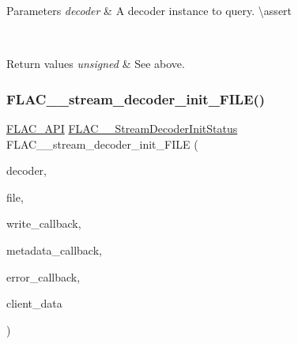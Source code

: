 \begin{DoxyParams}{Parameters}
{\em decoder} & A decoder instance to query. \textbackslash{}assert 
\begin{DoxyCode}{1}
\end{DoxyCode}
 \\
\hline
\end{DoxyParams}

\begin{DoxyRetVals}{Return values}
{\em unsigned} & See above. \\
\hline
\end{DoxyRetVals}
\mbox{\label{group__flac__stream__decoder_ga38f9eb46bf112af205f86b4cbac9980c}} 
\subsubsection{\texorpdfstring{FLAC\_\_stream\_decoder\_init\_FILE()}{FLAC\_\_stream\_decoder\_init\_FILE()}}
{\footnotesize\ttfamily \mbox{\hyperlink{group__flac__export_ga56ca07df8a23310707732b1c0007d6f5}{F\+L\+A\+C\+\_\+\+A\+PI}} \mbox{\hyperlink{group__flac__stream__decoder_gaaed54a24ac6310d29c5cafba79759c44}{F\+L\+A\+C\+\_\+\+\_\+\+Stream\+Decoder\+Init\+Status}} F\+L\+A\+C\+\_\+\+\_\+stream\+\_\+decoder\+\_\+init\+\_\+\+F\+I\+LE (\begin{DoxyParamCaption}\item[{\mbox{\hyperlink{struct_f_l_a_c_____stream_decoder}{F\+L\+A\+C\+\_\+\+\_\+\+Stream\+Decoder}} $\ast$}]{decoder,  }\item[{F\+I\+LE $\ast$}]{file,  }\item[{\mbox{\hyperlink{group__flac__stream__decoder_ga61e48dc2c0d2f6c5519290ff046874a4}{F\+L\+A\+C\+\_\+\+\_\+\+Stream\+Decoder\+Write\+Callback}}}]{write\+\_\+callback,  }\item[{\mbox{\hyperlink{group__flac__stream__decoder_ga6aa87c01744c1c601b7f371f627b6e14}{F\+L\+A\+C\+\_\+\+\_\+\+Stream\+Decoder\+Metadata\+Callback}}}]{metadata\+\_\+callback,  }\item[{\mbox{\hyperlink{group__flac__stream__decoder_gac896ee6a12668e9015fab4fbc6aae996}{F\+L\+A\+C\+\_\+\+\_\+\+Stream\+Decoder\+Error\+Callback}}}]{error\+\_\+callback,  }\item[{\mbox{\hyperlink{_s_d_l__opengles2__gl2ext_8h_ae5d8fa23ad07c48bb609509eae494c95}{void}} $\ast$}]{client\+\_\+data }\end{DoxyParamCaption})}

